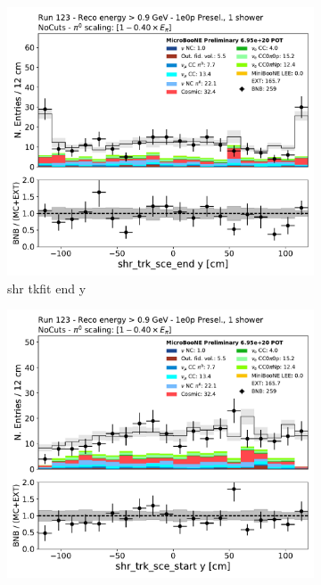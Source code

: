 \begin{figure}[H]
    \centering
    \begin{subfigure}{0.3\textwidth}
    \includegraphics[width=1.0\textwidth]{1e0p/High_E_Sideband/shr_trk_sce_end_y.pdf}
    \caption{shr tkfit end y}
    \end{subfigure}
    \begin{subfigure}{0.3\textwidth}
    \includegraphics[width=1.0\textwidth]{1e0p/High_E_Sideband/shr_trk_sce_start_y.pdf}

\end{subfigure}
\end{figure}
